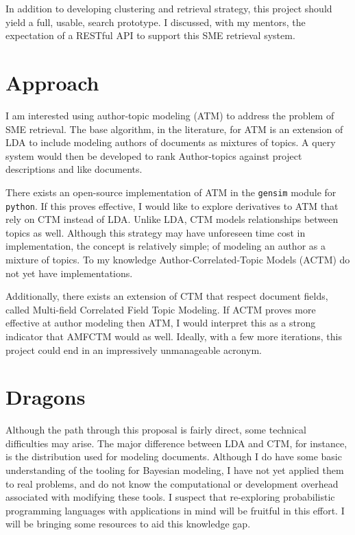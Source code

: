 \documentclass{article}
\begin{document}
\begin{multicols}{2}
In addition to developing clustering and retrieval strategy, this project should yield
a full, usable, search prototype. I discussed, with my mentors, the expectation of a
RESTful API to support this SME retrieval system.

\section{Approach}

I am interested using author-topic\cite{Rosen-Zvi2004} modeling (ATM) to address the
problem of SME retrieval. The base algorithm, in the literature, for ATM is an
extension of LDA to include modeling authors of documents as mixtures of topics. A
query system would then be developed to rank Author-topics against project
descriptions and like documents.

There exists an open-source implementation of ATM in the \texttt{gensim}\cite{rehurek_lrec}
module for \texttt{python}. If this proves effective, I would like to explore
derivatives to ATM that rely on CTM instead of LDA. Unlike LDA, CTM models
relationships between topics as well. Although this strategy may have unforeseen time
cost in implementation, the concept is relatively simple; of modeling an author as a
mixture of topics. To my knowledge Author-Correlated-Topic Models (ACTM) do not yet
have implementations.

Additionally, there exists an extension of CTM that respect document fields, called
Multi-field Correlated Field Topic Modeling\cite{Salomatin2009MultifieldCT}. If ACTM
proves more effective at author modeling then ATM, I would interpret this as a strong
indicator that AMFCTM would as well. Ideally, with a few more iterations, this
project could end in an impressively unmanageable acronym.

\section{Dragons}

Although the path through this proposal is fairly direct, some technical difficulties may arise.
The major difference between LDA and CTM, for instance, is the distribution used for modeling
documents. Although I do have some basic understanding of the tooling for Bayesian modeling,
I have not yet applied them to real problems, and do not know the computational or development
overhead associated with modifying these tools. I suspect that re-exploring probabilistic
programming languages with applications in mind will be fruitful in this effort.
I will be bringing some resources\cite{lambert2018} to aid this knowledge gap.


\end{multicols}
\end{document}
